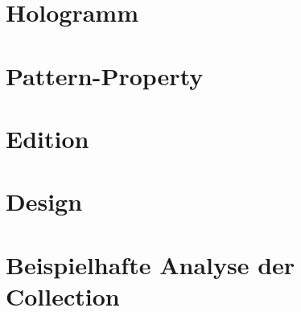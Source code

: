 \documentclass[11pt]{scrartcl}
\begin{document}
\section{Hologramm}
\label{sec:hologramm}
\vspace{0.3cm}
%


\section{Pattern-Property}
\vspace{0.3cm}
%


\section{Edition}
\vspace{0.3cm}

\section{Design}
\vspace{0.3cm}
%
\newpage


\section{Beispielhafte Analyse der Collection}
\vspace{0.3cm}
% 




 
\end{document}
